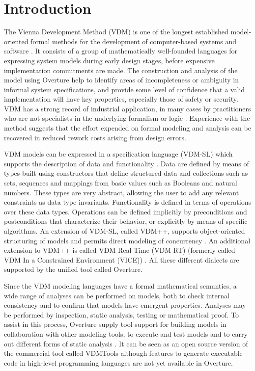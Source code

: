 \documentclass{overturerepchap}
\begin{document}
\chapter{Introduction}

The Vienna Development Method (VDM) is one of the longest established
model-oriented formal methods for the development of computer-based
systems and software
\cite{Bjorner&78,Jones90a,Fitzgerald&08c}. It consists of a
group of mathematically well-founded languages for expressing system
models during early design stages, before expensive implementation
commitments are made. The construction and analysis of the model using
Overture help to identify areas of incompleteness or ambiguity in
informal system specifications, and provide some level of confidence
that a valid implementation will have key properties, especially those
of safety or security. VDM has a strong record of industrial
application, in many cases by practitioners who are not specialists in
the underlying formalism or logic
\cite{Larsen&95b,Clement&99,Kurita&09}. Experience with the method
suggests that the effort expended on formal modeling and analysis can
be recovered in reduced rework costs arising from design errors.

VDM models can be expressed in a specification language (VDM-SL) which
supports the description of data and functionality
\cite{ISOVDM96a,Fitzgerald&98b,Fitzgerald&09}. Data are defined by
means of types built using constructors that define structured data
and collections such as sets, sequences and mappings from basic values
such as Booleans and natural numbers. These types are very abstract, allowing
the user to add any relevant constraints as data type
invariants. Functionality is defined in terms of operations over these
data types. Operations can be defined implicitly by preconditions and
postconditions that characterize their behavior, or explicitly by
means of specific algorithms. An extension of VDM-SL, called VDM++,
supports object-oriented structuring of models and permits direct
modeling of concurrency \cite{Fitzgerald&05}. An additional extension
to VDM++ is called VDM Real Time (VDM-RT) (formerly called VDM In a
Constrained Environment (VICE)) \cite{Mukherjee&00,Verhoef&06b}. All
these different dialects are supported by the unified tool called Overture.

Since the VDM modeling languages have a formal mathematical semantics,
a wide range of analyses can be performed on models, both to check
internal consistency and to confirm that models have emergent
properties. Analyses may be performed by inspection, static analysis,
testing or mathematical proof. To assist in this process, Overture
supply tool support for building models in collaboration with other
modeling tools, to execute and test models and to carry out different
forms of static analysis \cite{Larsen&10a}. It can be seen as an open
source version of the commercial tool called VDMTools
\cite{Elmstrom&94,Larsen01,Fitzgerald&08a} although features to
generate executable code in high-level programming languages are
not yet available in Overture.
\end{document}
